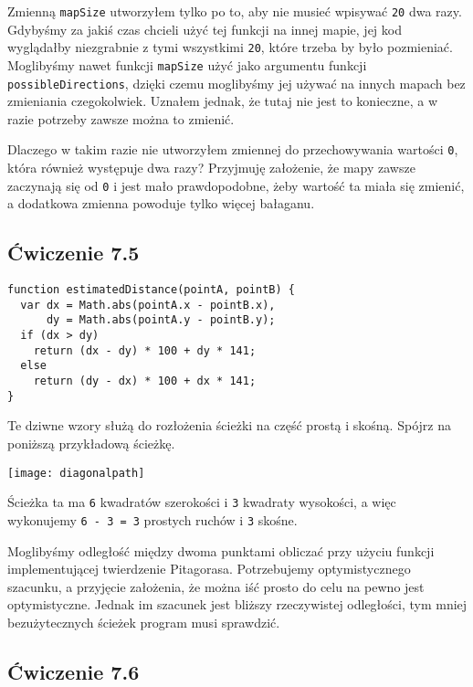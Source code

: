 Zmienną \texttt{mapSize} utworzyłem tylko po to, aby nie musieć wpisywać \texttt{20} dwa razy. Gdybyśmy za jakiś czas chcieli użyć tej funkcji na innej mapie, jej kod wyglądałby niezgrabnie z tymi wszystkimi \texttt{20}, które trzeba by było pozmieniać. Moglibyśmy nawet funkcji \texttt{mapSize} użyć jako argumentu funkcji \texttt{possibleDirections}, dzięki czemu moglibyśmy jej używać na innych mapach bez zmieniania czegokolwiek. Uznałem jednak, że tutaj nie jest to konieczne, a w razie potrzeby zawsze można to zmienić.

    
Dlaczego w takim razie nie utworzyłem zmiennej do przechowywania wartości \texttt{0}, która również występuje dwa razy? Przyjmuję założenie, że mapy zawsze zaczynają się od \texttt{0} i jest mało prawdopodobne, żeby wartość ta miała się zmienić, a dodatkowa zmienna powoduje tylko więcej bałaganu.

  
\subsection*{Ćwiczenie 7.5}
\label{sol:7.5}
    
\begin{verbatim} 
function estimatedDistance(pointA, pointB) {
  var dx = Math.abs(pointA.x - pointB.x),
      dy = Math.abs(pointA.y - pointB.y);
  if (dx > dy)
    return (dx - dy) * 100 + dy * 141;
  else
    return (dy - dx) * 100 + dx * 141;
}
 \end{verbatim}
    
Te dziwne wzory służą do rozłożenia ścieżki na część prostą i skośną. Spójrz na poniższą przykładową ścieżkę.

\bigskip 
\centerline{\texttt{[image: diagonalpath]}} 
\smallskip
    
Ścieżka ta ma \texttt{6} kwadratów szerokości i \texttt{3} kwadraty wysokości, a więc wykonujemy \texttt{6 - 3 = 3} prostych ruchów i \texttt{3} skośne.

    
Moglibyśmy odległość między dwoma punktami obliczać przy użyciu funkcji implementującej twierdzenie Pitagorasa. Potrzebujemy optymistycznego szacunku, a przyjęcie założenia, że można iść prosto do celu na pewno jest optymistyczne. Jednak im szacunek jest bliższy rzeczywistej odległości, tym mniej bezużytecznych ścieżek program musi sprawdzić.

  
\subsection*{Ćwiczenie 7.6}
\label{sol:7.6}
    
